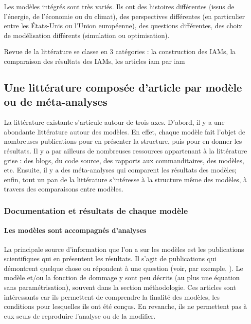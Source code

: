 Les modèles intégrés sont très variés. Ils ont des histoires différentes (issus de l'énergie, de l'économie ou du climat), des perspectives différentes (en particulier entre les États-Unis ou l'Union européenne), des questions différentes, des choix de modélisation différents (simulation ou optimisation). 

Revue de la littérature se classe en 3 catégories : la construction des IAMs, la comparaison des résultats des IAMs, les articles iam par iam

\subsection{Une littérature composée d'article par modèle ou de méta-analyses}

La littérature existante s'articule autour de trois axes. D'abord, il y a une abondante littérature autour des modèles. En effet, chaque modèle fait l'objet de nombreuses publications pour en présenter la structure, puis pour en donner les résultats. Il y a par ailleurs de nombreuses ressources appartenant à la littérature grise : des blogs, du code source, des rapports aux commanditaires, des modèles, etc. Ensuite, il y a des méta-analyses qui comparent les résultats des modèles; enfin, tout un pan de la littérature s'intéresse à la structure même des modèles, à travers des comparaisons entre modèles. 

\subsubsection{Documentation et résultats de chaque modèle}

\paragraph{Les modèles sont accompagnés d'analyses}

La principale source d'information que l'on a sur les modèles est les publications scientifiques qui en présentent les résultats.
Il s'agit de publications qui démontrent quelque chose ou répondent à une question (voir, par exemple, \cite{int_panis_externe_2000, dafermos_how_2021, baumstark_remind21_2021, dafermos_stock-flow-fund_2017, cherp_global_2016, burke_global_2015}). Le modèle et/ou la fonction de dommage y sont peu décrits (au plus une équation sans paramétrisation), souvent dans la section méthodologie. Ces articles sont intéressants car ils permettent de comprendre la finalité des modèles, les conditions pour lesquelles ils ont été conçus. En revanche, ils ne permettent pas à eux seuls de reproduire l'analyse ou de la modifier. 


